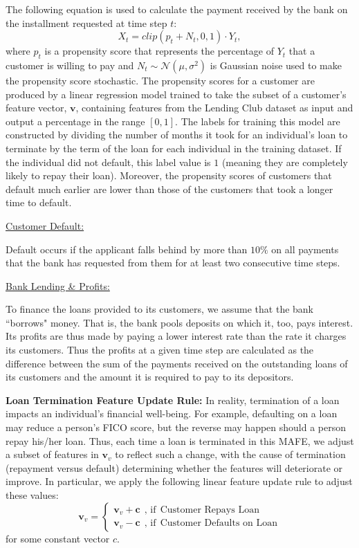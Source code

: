 The following equation is used to calculate the payment received by the bank on the installment requested at time step $t$:
\begin{equation}
    X_t = clip(p_t+N_t,0,1)\cdot Y_t,
\end{equation}
where $p_t$ is a propensity score that represents the percentage of $Y_t$ that a customer is willing to pay and $N_t\sim \mathcal{N}(\mu,\sigma^2)$ is Gaussian noise used to make the propensity score stochastic. The propensity scores for a customer are produced by a linear regression model trained to take the subset of a customer's feature vector, $\mathbf{v}$, containing features from the Lending Club dataset as input and output a percentage in the range $[0,1]$. The labels for training this model are constructed by dividing the number of months it took for an individual's loan to terminate by the term of the loan for each individual in the training dataset. If the individual did not default, this label value is $1$ (meaning they are completely likely to repay their loan). Moreover, the propensity scores of customers that default much earlier are lower than those of the customers that took a longer time to default.

\underline{Customer Default:} 

Default occurs if the applicant falls behind by more than $10\%$ on all payments that the bank has requested from them for at least two consecutive time steps.

\underline{Bank Lending \& Profits:} 

To finance the loans provided to its customers, we assume that the bank ``borrows" money. That is, the bank pools deposits on which it, too, pays interest. Its profits are thus made by paying a lower interest rate than the rate it charges its customers. Thus the profits at a given time step are calculated as the difference between the sum of the payments received on the outstanding loans of its customers and the amount it is required to pay to its depositors.

\textbf{Loan Termination Feature Update Rule:}
In reality, termination of a loan impacts an individual's financial well-being. For example, defaulting on a loan may reduce a person's FICO score, but the reverse may happen should a person repay his/her loan. Thus, each time a loan is terminated in this MAFE, we adjust a subset of features in $\mathbf{v}_{v}$ to reflect such a change, with the cause of termination (repayment versus default) determining whether the features will deteriorate or improve. In particular, we apply the following linear feature update rule to adjust these values:
\begin{equation}
    \mathbf{v}_v = 
    \begin{cases} 
        \mathbf{v}_v + \mathbf{c} \ \  \text{, if} \ \  \text{Customer Repays Loan} \\
        \mathbf{v}_v - \mathbf{c}  \ \ \text{, if} \ \  \text{Customer Defaults on Loan}
    \end{cases}
\end{equation}
for some constant vector $c$.

